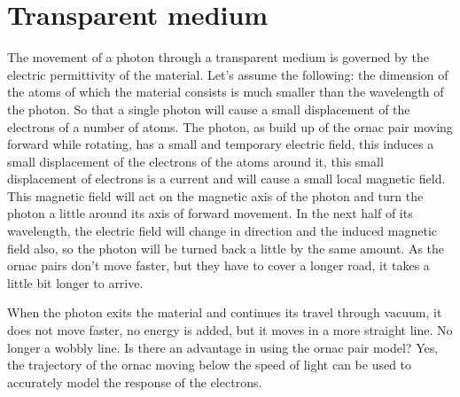 \section{Transparent medium}

The movement of a photon through a transparent medium is governed by the electric permittivity of the material. Let's assume the following: the dimension of the atoms of which the material consists is much smaller than the wavelength of the photon. So that a single photon will cause a small displacement of the electrons of a number of atoms. The photon, as build up of the ornac pair moving forward while rotating, has a small and temporary electric field, this induces a small displacement of the electrons of the atoms around it, this small displacement of electrons is a current and will cause a small local magnetic field. This magnetic field will act on the magnetic axis of the photon and turn the photon a little around its axis of forward movement. In the next half of its wavelength, the electric field will change in direction and the induced magnetic field also, so the photon will be turned back a little by the same amount.
As the ornac pairs don't move faster, but they have to cover a longer road, it takes a little bit longer to arrive. 

When the photon exits the material and continues its travel through vacuum, it does not move faster, no energy is added, but it moves in a more straight line. No longer a wobbly line. Is there an advantage in using the ornac pair model? Yes, the trajectory of the ornac moving below the speed of light can be used to accurately model the response of the electrons.


